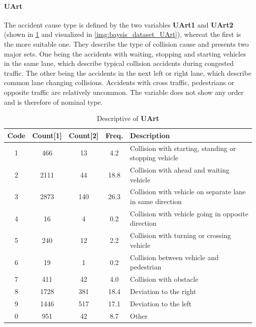 \paragraph{UArt}
\label{baysis_dataset_UArt}
The accident cause type is defined by the two variables \textbf{UArt1} and \textbf{UArt2} (shown in \cref{tbl:baysis_dataset_UArt} and visualized in \cref{img:baysis_dataset_UArt}), whereat the first is the more suitable one. They describe the type of collision cause and presents two major sets. One being the accidents with waiting, stopping and starting vehicles in the same lane, which describe typical collision accidents during congested traffic. The other being the accidents in the next left or right lane, which describe common lane changing collisions. Accidents with cross traffic, pedestrians or opposite traffic are relatively uncommon. The variable does not show any order and is therefore of nominal type.
\begin{table}[ht]
	\centering
	\small
	\begin{tabular}{c|c|c|c|l} 
		\toprule
		Code & Count[1] & Count[2] & Freq. & Description \\ 
		\midrule
 		1 & 466		& 13	& 4.2  & Collision with starting, standing or stopping vehicle  \\ 
 		2 & 2111	& 44 	& 18.8 & Collision with ahead and waiting vehicle  \\
 		3 & 2873	& 140	& 26.3 & Collision with vehicle on separate lane in same direction  \\
 		4 &	16		& 4		& 0.2   & Collision with vehicle going in opposite direction  \\
 		5 & 240		& 12	& 2.2  & Collision with turning or crossing vehicle  \\
 		6 & 19		& 1		& 0.2   & Collision between vehicle and pedestrian  \\
 		7 & 411		& 42	& 4.0  & Collision with obstacle  \\
 		8 & 1728	& 381	& 18.4 & Deviation to the right  \\
 		9 & 1446	& 517	& 17.1 & Deviation to the left  \\
		0 & 951		& 42	& 8.7  & Other  \\
		\bottomrule
	\end{tabular}
	\caption{Descriptive of \textbf{UArt}}
	\label{tbl:baysis_dataset_UArt}
\end{table}
